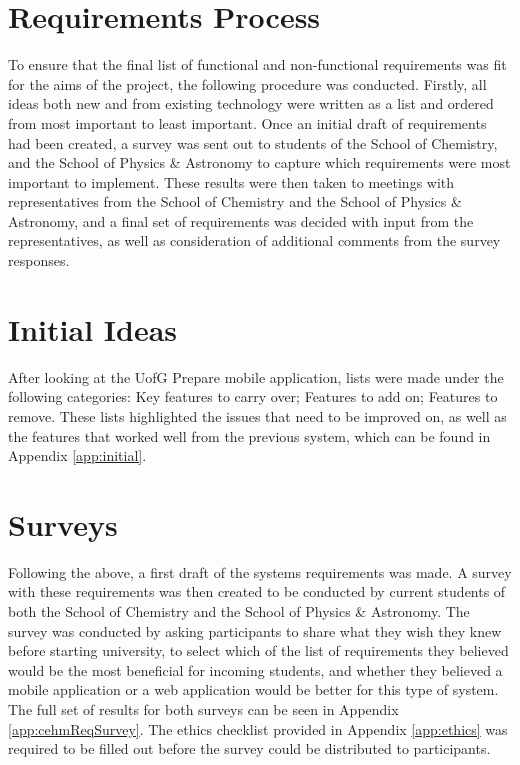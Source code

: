 \documentclass{l4proj}
\begin{document}
\section{Requirements Process}
To ensure that the final list of functional and non-functional requirements was fit for the aims of the project,  the following procedure was conducted. Firstly,  all ideas both new and from existing technology were written as a list and ordered from most important to least important. Once an initial draft of requirements had been created,  a survey was sent out to students of the School of Chemistry,  and the School of Physics \& Astronomy to capture which requirements were most important to implement. These results were then taken to meetings with representatives from the School of Chemistry and the School of Physics \& Astronomy,  and a final set of requirements was decided with input from the representatives,  as well as consideration of additional comments from the survey responses.

\section{Initial Ideas}
After looking at the UofG Prepare mobile application,  lists were made under the following categories: Key features to carry over; Features to add on; Features to remove. These lists highlighted the issues that need to be improved on,  as well as the features that worked well from the previous system,  which can be found in Appendix \ref{app:initial}.


\section{Surveys} \label{surveys}
Following the above, a first draft of the systems requirements was made. A survey with these requirements was then created to be conducted by current students of both the School of Chemistry and the School of Physics \& Astronomy. The survey was conducted by asking participants to share what they wish they knew before starting university,  to select which of the list of requirements they believed would be the most beneficial for incoming students,  and whether they believed a mobile application or a web application would be better for this type of system. The full set of results for both surveys can be seen in Appendix \ref{app:cehmReqSurvey}. The ethics checklist provided in Appendix \ref{app:ethics} was required to be filled out before the survey could be distributed to participants. 
\end{document}
